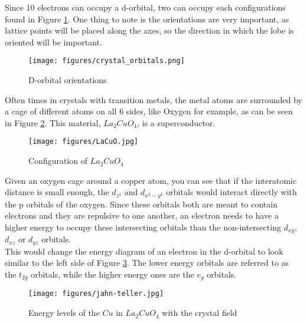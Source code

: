 \documentclass[11pt,onecolumn]{article}
\begin{document}
Since 10 electrons can occupy a d-orbital, two can occupy each configurations found in Figure \ref{fig:1}. One thing to note is the orientations are very important, as lattice points will be placed along the axes, so the direction in which the lobe is oriented will be important.

\begin{figure}[ht]
	\begin{center}
		\texttt{[image: figures/crystal\_orbitals.png]}
		\caption{D-orbital orientations}
		\label{fig:1}
	\end{center}
\end{figure}

Often times in crystals with transition metals, the metal atoms are surrounded by a cage of different atoms on all 6 sides, like Oxygen for example, as can be seen in Figure \ref{fig:2}. This material, $La_2CuO_{4}$, is a superconductor. 

\begin{figure}[ht]
	\begin{center}
		\texttt{[image: figures/LaCuO.jpg]}
		\caption{Configuration of $La_2CuO_{4}$}
		\label{fig:2}
	\end{center}
\end{figure}

Given an oxygen cage around a copper atom, you can see that if the interatomic distance is small enough, the $d_{z^2}$ and $d_{x^2-y^2}$ orbitals would interact directly with the p orbitals of the oxygen. Since these orbitals both are meant to contain electrons and they are repulsive to one another, an electron needs to have a higher energy to occupy these intersecting orbitals than the non-intersecting $d_{xy}$, $d_{xz}$ or $d_{yz}$ orbitals.\\

This would change the energy diagram of an electron in the d-orbital to look similar to the left side of Figure \ref{fig:3}. The lower energy orbitals are referred to as the $t_{2g}$ orbitals, while the higher energy ones are the $e_g$ orbitals.\\

\begin{figure}[ht]
	\begin{center}
		\texttt{[image: figures/jahn-teller.jpg]}
		\caption{Energy levels of  the $Cu$ in $La_2CuO_{4}$ with the crystal field}
		\label{fig:3}
	\end{center}
\end{figure}
\end{document}
